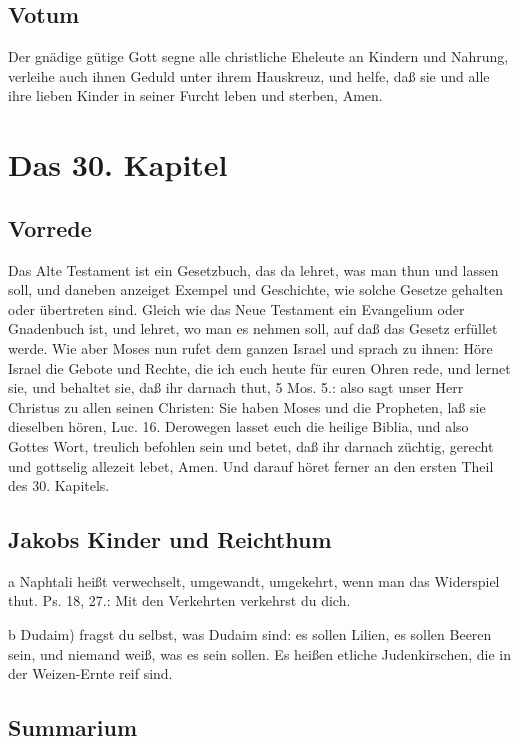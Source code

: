 \section{Votum}

Der gnädige gütige Gott segne alle christliche Eheleute an Kindern und Nahrung, verleihe auch ihnen Geduld unter ihrem Hauskreuz, und helfe, daß sie und alle ihre lieben Kinder in seiner Furcht leben und sterben, Amen.

\chapter{Das 30. Kapitel}

\section{Vorrede}

Das Alte Testament ist ein Gesetzbuch, das da lehret, was man thun und lassen soll, und daneben anzeiget Exempel und Geschichte, wie solche Gesetze gehalten oder übertreten sind. Gleich wie das Neue Testament ein Evangelium oder Gnadenbuch ist, und lehret, wo man es nehmen soll, auf daß das Gesetz erfüllet werde. Wie aber Moses nun rufet dem ganzen Israel und sprach zu ihnen: Höre Israel die Gebote und Rechte, die ich euch heute für euren Ohren rede, und lernet sie, und behaltet sie, daß ihr darnach thut, 5 Mos. 5.: also sagt unser Herr Christus zu allen seinen Christen: Sie haben Moses und die Propheten, laß sie dieselben hören, Luc. 16. Derowegen lasset euch die heilige Biblia, und also Gottes Wort, treulich befohlen sein und betet, daß ihr darnach züchtig, gerecht und gottselig allezeit lebet, Amen. Und darauf höret ferner an den ersten Theil des 30. Kapitels.

\section{Jakobs Kinder und Reichthum}

a Naphtali heißt verwechselt, umgewandt, umgekehrt, wenn man das Widerspiel thut. Ps. 18, 27.: Mit den Verkehrten verkehrst du dich.

b Dudaim) fragst du selbst, was Dudaim sind: es sollen Lilien, es sollen Beeren sein, und niemand weiß, was es sein sollen. Es heißen etliche Judenkirschen, die in der Weizen-Ernte reif sind.

\section{Summarium}

